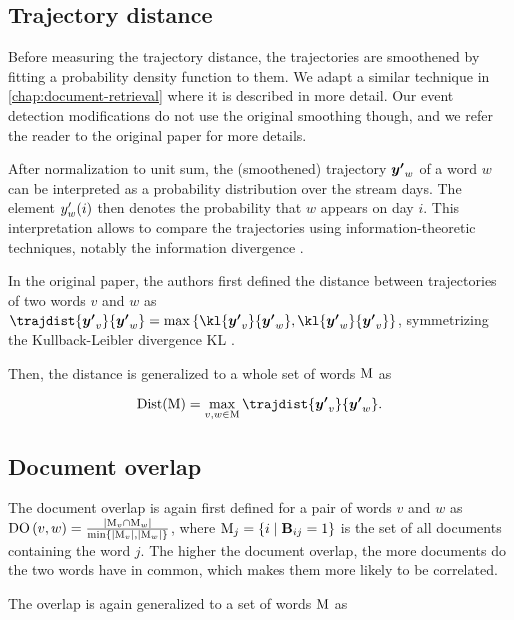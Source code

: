 \subsection{Trajectory distance}
Before measuring the trajectory distance, the trajectories are smoothened by fitting a probability density function to them. We adapt a similar technique in \autoref{chap:document-retrieval} where it is described in more detail. Our event detection modifications do not use the original smoothing though, and we refer the reader to the original paper for more details.

After normalization to unit sum, the (smoothened) trajectory $\vect{\trajn}_{w}$ of a word $w$ can be interpreted as a probability distribution over the stream days. The element $y'_{w}(i)$ then denotes the probability that $w$ appears on day $i$. This interpretation allows to compare the trajectories using information-theoretic techniques, notably the information divergence \citep{information-theory}.

In the original paper, the authors first defined the distance between trajectories of two words $v$ and $w$ as $\trajdist{\vect{\trajn}_{v}}{\vect{\trajn}_{w}} = \max \left\{ \kl{\vect{\trajn}_{v}}{\vect{\trajn}_{w}}, \kl{\vect{\trajn}_{w}}{\vect{\trajn}_{v}} \right\}$, symmetrizing the Kullback-Leibler divergence KL \citep{kl-divergence}.

Then, the distance is generalized to a whole set of words $\text{M}$ as

\begin{equation} \label{eq:trajectory-distance}
	\text{Dist}( \featset ) = \max_{v, w \in \featset} \trajdist{\vect{\trajn}_{v}}{\vect{\trajn}_{w}}.
\end{equation}

\subsection{Document overlap}
The document overlap is again first defined for a pair of words $v$ and $w$ as $\text{DO}\left( v, w \right) = \frac{| \text{M}_{v} \cap \text{M}_{w} |}{\min \left\{ | \text{M}_{v} |, | \text{M}_{w} | \right\}}$, where $\text{M}_{j} = \{ i \mid \mathbf{B}_{ij} = 1 \}$ is the set of all documents containing the word $j$. The higher the document overlap, the more documents do the two words have in common, which makes them more likely to be correlated.

The overlap is again generalized to a set of words $\text{M}$ as

